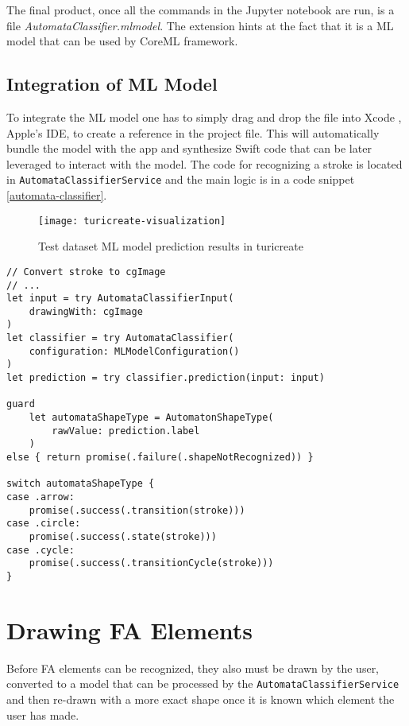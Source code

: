 The final product, once all the commands in the Jupyter notebook are run, is a file \textit{AutomataClassifier.mlmodel}. The extension hints at the fact that it is a ML model that can be used by CoreML framework.

\subsection{Integration of ML Model}

To integrate the ML model one has to simply drag and drop the file into Xcode \cite{xcode}, Apple's IDE, to create a reference in the project file. This will automatically bundle the model with the app and synthesize Swift code that can be later leveraged to interact with the model. The code for recognizing a stroke is located in \lstinline{AutomataClassifierService} and the main logic is in a code snippet \ref{automata-classifier}.

\begin{figure}
    \texttt{[image: turicreate-visualization]}
    \caption{Test dataset ML model prediction results in turicreate}\label{turicreate-visualization}
\end{figure}

\begin{lstlisting}[caption=Automata classifier, label=automata-classifier]
// Convert stroke to cgImage
// ...
let input = try AutomataClassifierInput(
    drawingWith: cgImage
)
let classifier = try AutomataClassifier(
    configuration: MLModelConfiguration()
)
let prediction = try classifier.prediction(input: input)

guard
    let automataShapeType = AutomatonShapeType(
        rawValue: prediction.label
    )
else { return promise(.failure(.shapeNotRecognized)) }

switch automataShapeType {
case .arrow:
    promise(.success(.transition(stroke)))
case .circle:
    promise(.success(.state(stroke)))
case .cycle:
    promise(.success(.transitionCycle(stroke)))
}
\end{lstlisting}

\section{Drawing FA Elements}

Before FA elements can be recognized, they also must be drawn by the user, converted to a model that can be processed by the \lstinline{AutomataClassifierService} and then re-drawn with a more exact shape once it is known which element the user has made.

